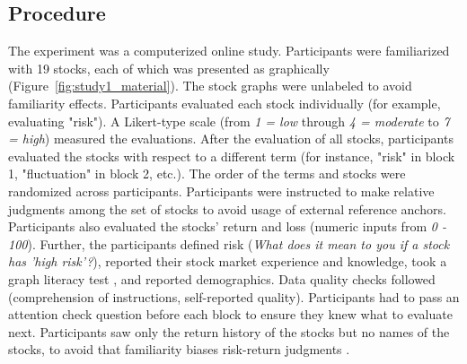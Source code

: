 \documentclass[a4paper,man, natbib,floatsintext]{apa6} %
\begin{document}
\subsection{Procedure} The experiment was a computerized online study. Participants were familiarized with 19 stocks, each of which was presented as graphically (Figure~\ref{fig:study1_material}). The stock graphs were unlabeled to avoid familiarity effects. Participants evaluated each stock individually (for example, evaluating "risk"). A Likert-type scale (from \textit{1 = low} through \textit{4 = moderate} to \textit{7 = high}) measured the evaluations. After the evaluation of all stocks, participants evaluated the stocks with respect to a different term (for instance, "risk" in block 1, "fluctuation" in block 2, etc.). The order of the terms and stocks were randomized across participants. Participants were instructed to make relative judgments among the set of stocks to avoid usage of external reference anchors. Participants also evaluated the stocks' return and loss (numeric inputs from \textit{0 - 100}). Further, the participants defined risk (\textit{What does it mean to you if a stock has 'high risk'?}), reported their stock market experience and knowledge, took a graph literacy test \citep{Garcia-Retamero2013a}, and reported demographics. Data quality checks followed (comprehension of instructions, self-reported quality). Participants had to pass an attention check question before each block to ensure they knew what to evaluate next. Participants saw only the return history of the stocks but no names of the stocks, to avoid that familiarity biases risk-return judgments \citep{Ganzach2000}.
\end{document}
